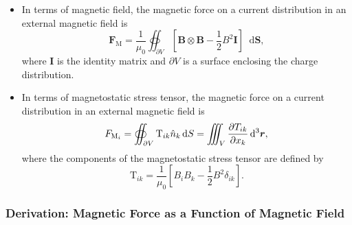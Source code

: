 \documentclass[11pt, a4paper]{article}
\newcommand{\diff}{\mathop{}\!\mathrm{d}} %
\newcommand{\dr}{\diff^{3} \r}  %
\renewcommand{\vec}[1]{\bm{#1}} %
\newcommand{\mat}[1]{\mathbf{#1}} %
\renewcommand{\r}{\vec{r}}
\newcommand{\B}{\vec{B}} %
\newcommand{\TT}{\mathrm{T}}  %
\newcommand{\mm}{\mu_{0}}  %
\begin{document}
\begin{itemize}
    \item In terms of magnetic field, the magnetic force on a current distribution in an external magnetic field is
    \begin{equation*}
        \vec{F}_{\text{M}} = \frac{1}{\mm} \oiint_{\partial V} \left[ \B \otimes \B - \frac{1}{2}B^{2} \mat{I} \right] \diff \vec{S},
    \end{equation*}
    where $ \mat{I} $ is the identity matrix and $ \partial V $ is a surface enclosing the charge distribution.

    \item In terms of magnetostatic stress tensor, the magnetic force on a current distribution in an external magnetic field is
    \begin{equation*}
        F_{\text{M}_{i}} = \oiint_{\partial V} \TT_{ik} \hat{n}_{k}\diff S = \iiint_{V} \pdv{T_{ik}}{x_{k}} \dr,
    \end{equation*}
    where the components of the magnetostatic stress tensor are defined by
    \begin{equation*}
        \TT_{ik} = \frac{1}{\mm} \left[ B_{i}B_{k} - \frac{1}{2}B^{2} \delta_{ik} \right].
    \end{equation*}
    
\end{itemize}

\subsubsection{Derivation: Magnetic Force as a Function of Magnetic Field}
\end{document}
